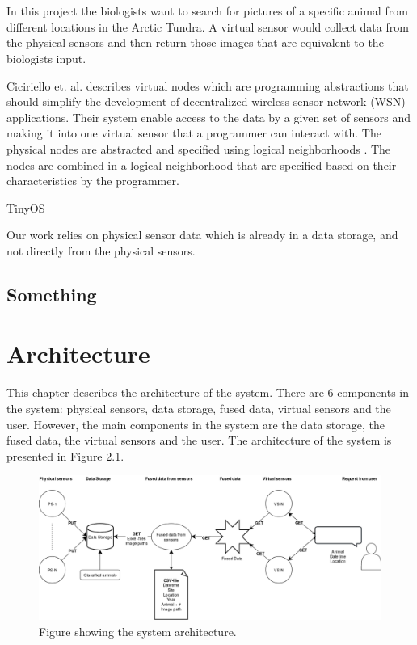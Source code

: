 \documentclass[USenglish]{uit-thesis}
\begin{document}
\\ \\
In this project the biologists want to search for pictures of a specific animal from different locations in the Arctic Tundra. A virtual sensor would collect data from the physical sensors and then return those images that are equivalent to the biologists input.

Ciciriello et. al.\cite{Ciciriello} describes virtual nodes which are programming abstractions that should simplify the development of decentralized wireless sensor network (WSN) applications. Their system enable access to the data by a given set of sensors and making it into one virtual sensor that a programmer can interact with.
The physical nodes are abstracted and specified using logical neighborhoods \cite{Mottola2006}\cite{Mottola2006_2}. The nodes are combined in a logical neighborhood that are specified based on their characteristics by the programmer. 

TinyOS \cite{TinyOS}

Our work relies on physical sensor data which is already in a data storage, and not directly from the physical sensors.


\section{Something}



\chapter{Architecture}
This chapter describes the architecture of the system.
There are 6 components in the system: physical sensors, data storage, fused data, virtual sensors and the user. However, the main components in the system are the data storage, the fused data, the virtual sensors and the user.
The architecture of the system is presented in Figure \ref{fig:architecture}.

\begin{figure}
\centering
\includegraphics[width=\textwidth]{Architecture2.png}
\caption{Figure showing the system architecture.}
\label{fig:architecture}
\end{figure}
\end{document}
